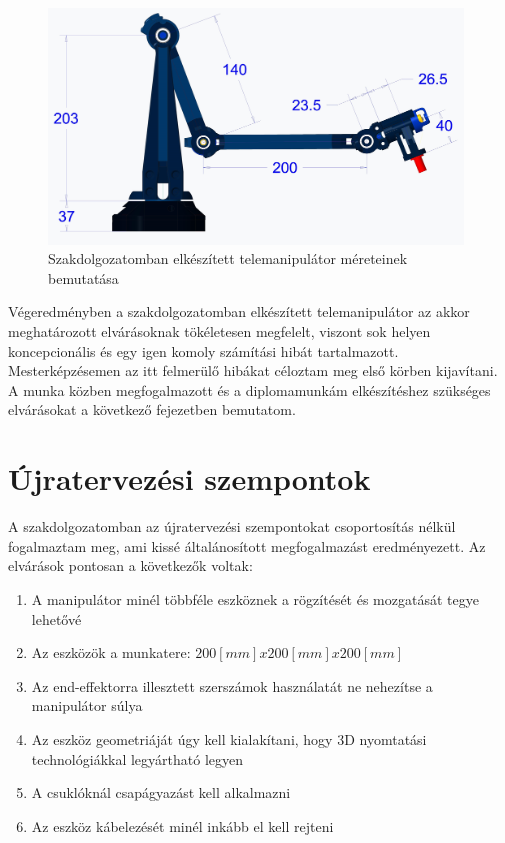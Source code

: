 \begin{figure}[!ht]
\centering
\includegraphics[width=110mm, keepaspectratio]{figures/Szakdoga/00_v_4_kar}
\caption{Szakdolgozatomban elkészített telemanipulátor méreteinek bemutatása}
\label{fig:Szakdoga_telemanip_meret}
\end{figure}

Végeredményben a szakdolgozatomban elkészített telemanipulátor az akkor meghatározott elvárásoknak tökéletesen megfelelt, viszont sok helyen koncepcionális és egy igen komoly számítási hibát tartalmazott. Mesterképzésemen az itt felmerülő hibákat céloztam meg első körben kijavítani. A munka közben megfogalmazott és a diplomamunkám elkészítéshez szükséges elvárásokat a következő fejezetben bemutatom.

\section{Újratervezési szempontok}
\label{sec:ujratervezesi_szempontok}

A szakdolgozatomban az újratervezési szempontokat csoportosítás nélkül fogalmaztam meg, ami kissé általánosított megfogalmazást eredményezett. Az elvárások pontosan a következők voltak:

\begin{enumerate}
\item A manipulátor minél többféle eszköznek a rögzítését és mozgatását tegye lehetővé
\item Az eszközök a munkatere: $200[mm]x200[mm]x200[mm]$
\item Az end-effektorra illesztett szerszámok használatát ne nehezítse a manipulátor súlya
\item Az eszköz geometriáját úgy kell kialakítani, hogy 3D nyomtatási technológiákkal legyártható legyen
\item A csuklóknál csapágyazást kell alkalmazni
\item Az eszköz kábelezését minél inkább el kell rejteni
\end{enumerate}

